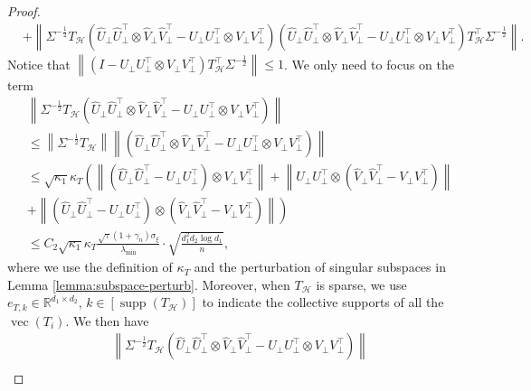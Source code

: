 \documentclass[12pt]{article}
\newcommand{\norm}[1]{\left\lVert#1\right\rVert}
\newcommand{\R}{\mathbb{R}}
\def\calH{{\mathcal H}}
\theoremstyle{plain}
\begin{document}
\begin{proof}
\begin{equation*}
\begin{aligned}
      &+  \norm{\Sigma^{-\frac{1}{2}}T_{\calH}\left(\widehat U_\perp \widehat U_\perp^\top \otimes \widehat V_\perp \widehat V_\perp^\top - U_\perp U_\perp^\top \otimes V_\perp V_\perp^\top\right) \left(\widehat U_\perp \widehat U_\perp^\top \otimes \widehat V_\perp \widehat V_\perp^\top - U_\perp U_\perp^\top \otimes V_\perp V_\perp^\top\right) T_{\calH}^\top \Sigma^{-\frac{1}{2}}}.
    \end{aligned}
\end{equation*}
Notice that $\norm{\left(I-U_\perp U_\perp^\top \otimes V_\perp V_\perp^\top\right) T_{\calH}^\top \Sigma^{-\frac{1}{2}}}\le 1$. We only need to focus on the term
\begin{equation*}
    \begin{aligned}
      &\norm{\Sigma^{-\frac{1}{2}}T_{\calH}\left(\widehat U_\perp \widehat U_\perp^\top \otimes \widehat V_\perp \widehat V_\perp^\top - U_\perp U_\perp^\top \otimes V_\perp V_\perp^\top\right)}  \\
      & \le  \norm{\Sigma^{-\frac{1}{2}} T_{\calH} }\norm{\left(\widehat U_\perp \widehat U_\perp^\top \otimes \widehat V_\perp \widehat V_\perp^\top - U_\perp U_\perp^\top \otimes V_\perp V_\perp^\top\right)} \\
      & \le \sqrt{\kappa_1}\kappa_T\left( \norm{ \left(\widehat U_\perp \widehat U_\perp^\top -U_\perp U_\perp^\top \right)\otimes V_\perp V_\perp^\top} +\norm{U_\perp U_\perp^\top \otimes \left( \widehat V_\perp \widehat V_\perp^\top-V_\perp V_\perp^\top\right) }\right. \\
      & + \left.\norm{ \left(\widehat U_\perp \widehat U_\perp^\top -U_\perp U_\perp^\top \right)\otimes \left( \widehat V_\perp \widehat V_\perp^\top-V_\perp V_\perp^\top\right)}\right)\\
      & \le C_2 \sqrt{\kappa_1}\kappa_T \frac{\sqrt{\tau}\left(1+\gamma_{n}\right) \sigma_{\xi}}{\lambda_{\min}} \cdot \sqrt{\frac{d_1^2 d_2 \log d_1}{n}},  
    \end{aligned}
\end{equation*}
where we use the definition of $\kappa_T$ and the perturbation of singular subspaces in Lemma \ref{lemma:subspace-perturb}. Moreover, when $T_{\calH}$ is sparse, we use $e_{T, k}\in \R^{d_1\times d_2} $, $k\in[\operatorname{supp}(T_{\calH} ) ]$ to indicate the collective supports of  all the $\operatorname{vec}(T_i)$. We then have
\begin{equation}\label{eq:sparse-T}
    \begin{aligned}
      &\norm{\Sigma^{-\frac{1}{2}}T_{\calH}\left(\widehat U_\perp \widehat U_\perp^\top \otimes \widehat V_\perp \widehat V_\perp^\top - U_\perp U_\perp^\top \otimes V_\perp V_\perp^\top\right)}  \\

\end{aligned}
\end{equation}
\end{proof}
\end{document}
